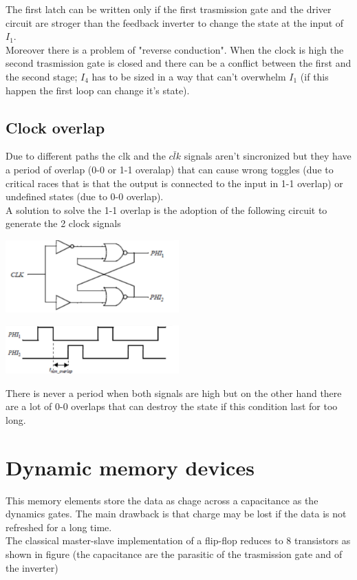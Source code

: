 The first latch can be written only if the first trasmission gate and the driver circuit are stroger than the feedback inverter to change the state at the input of $I_1$.\\
Moreover there is a problem of "reverse conduction". When the clock is high the second trasmission gate is closed and there can be a conflict between the first and the second stage; $I_4$ has to be sized in a way that can't overwhelm $I_1$ (if this happen the first loop can change it's state).\\

\subsection{Clock overlap}

Due to different paths the clk and the $\bar{clk}$ signals aren't sincronized but they have a period of overlap (0-0 or 1-1 overalap) that can cause wrong toggles (due to critical races that is that the output is connected to the input in 1-1 overlap) or undefined states (due to 0-0 overlap).\\
\vspace{5mm}
A solution to solve the 1-1 overlap is the adoption of the following circuit to generate the 2 clock signals

\centering
\includegraphics[width=0.5\textwidth]{C10_13.png}\\
\raggedright

\centering
\includegraphics[width=0.5\textwidth]{C10_14.png}\\
\raggedright

There is never a period when both signals are high but on the other hand there are a lot of 0-0 overlaps that can destroy the state if this condition last for too long.\\

\section{Dynamic memory devices}
This memory elements store the data as chage across a capacitance as the dynamics gates. The main drawback is that charge may be lost if the data is not refreshed for a long time.\\
The classical master-slave implementation of a flip-flop reduces to 8 transistors as shown in figure (the capacitance are the parasitic of the trasmission gate and of the inverter)

